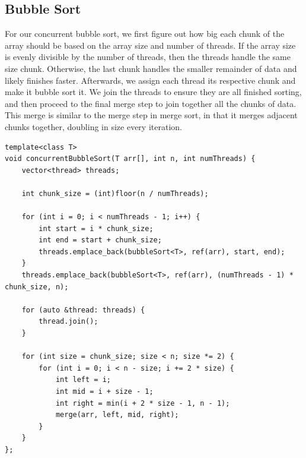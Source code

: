 \documentclass[conference]{IEEEtran}
\begin{document}
\subsection{Bubble Sort}
For our concurrent bubble sort, we first figure out how big each chunk of the array should be based on the array size and number of threads. If the array size is evenly divisible by the number of threads, then the threads handle the same size chunk. Otherwise, the last chunk handles the smaller remainder of data and likely finishes faster. Afterwards, we assign each thread its respective chunk and make it bubble sort it. We join the threads to ensure they are all finished sorting, and then proceed to the final merge step to join together all the chunks of data. This merge is similar to the merge step in merge sort, in that it merges adjacent chunks together, doubling in size every iteration.


\begin{lstlisting}
template<class T>
void concurrentBubbleSort(T arr[], int n, int numThreads) {
    vector<thread> threads;

    int chunk_size = (int)floor(n / numThreads);

    for (int i = 0; i < numThreads - 1; i++) {
        int start = i * chunk_size;
        int end = start + chunk_size;
        threads.emplace_back(bubbleSort<T>, ref(arr), start, end);
    }
    threads.emplace_back(bubbleSort<T>, ref(arr), (numThreads - 1) * chunk_size, n);

    for (auto &thread: threads) {
        thread.join();
    }

    for (int size = chunk_size; size < n; size *= 2) {
        for (int i = 0; i < n - size; i += 2 * size) {
            int left = i;
            int mid = i + size - 1;
            int right = min(i + 2 * size - 1, n - 1);
            merge(arr, left, mid, right);
        }
    }
};
\end{lstlisting}
\end{document}
